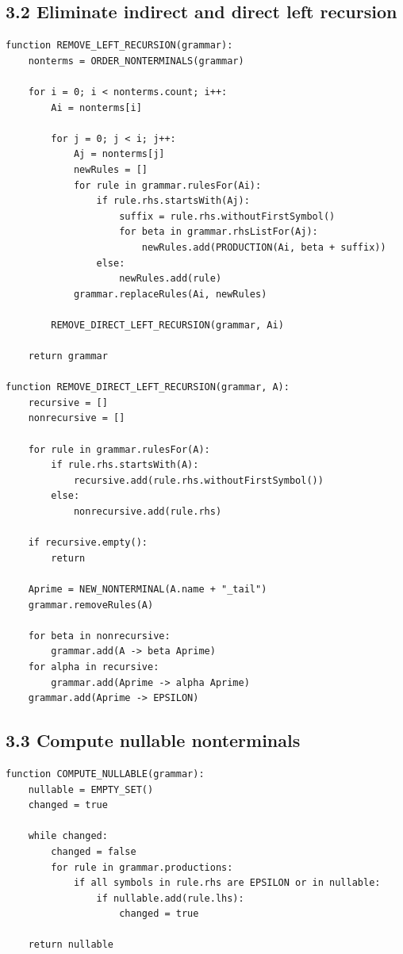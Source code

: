 \documentclass[10pt,letterpaper]{article}
\begin{document}
\subsection*{3.2 Eliminate indirect and direct left recursion}

\begin{verbatim}
function REMOVE_LEFT_RECURSION(grammar):
    nonterms = ORDER_NONTERMINALS(grammar)

    for i = 0; i < nonterms.count; i++:
        Ai = nonterms[i]

        for j = 0; j < i; j++:
            Aj = nonterms[j]
            newRules = []
            for rule in grammar.rulesFor(Ai):
                if rule.rhs.startsWith(Aj):
                    suffix = rule.rhs.withoutFirstSymbol()
                    for beta in grammar.rhsListFor(Aj):
                        newRules.add(PRODUCTION(Ai, beta + suffix))
                else:
                    newRules.add(rule)
            grammar.replaceRules(Ai, newRules)

        REMOVE_DIRECT_LEFT_RECURSION(grammar, Ai)

    return grammar

function REMOVE_DIRECT_LEFT_RECURSION(grammar, A):
    recursive = []
    nonrecursive = []

    for rule in grammar.rulesFor(A):
        if rule.rhs.startsWith(A):
            recursive.add(rule.rhs.withoutFirstSymbol())
        else:
            nonrecursive.add(rule.rhs)

    if recursive.empty():
        return

    Aprime = NEW_NONTERMINAL(A.name + "_tail")
    grammar.removeRules(A)

    for beta in nonrecursive:
        grammar.add(A -> beta Aprime)
    for alpha in recursive:
        grammar.add(Aprime -> alpha Aprime)
    grammar.add(Aprime -> EPSILON)
\end{verbatim}

\subsection*{3.3 Compute nullable nonterminals}

\begin{verbatim}
function COMPUTE_NULLABLE(grammar):
    nullable = EMPTY_SET()
    changed = true

    while changed:
        changed = false
        for rule in grammar.productions:
            if all symbols in rule.rhs are EPSILON or in nullable:
                if nullable.add(rule.lhs):
                    changed = true

    return nullable
\end{verbatim}
\end{document}

